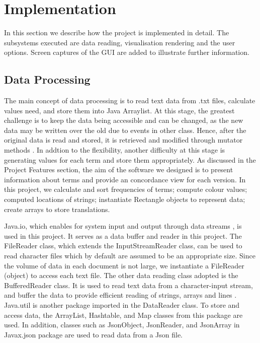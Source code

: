 \clearpage
\section{Implementation}
In this section we describe how the project is implemented in detail. The subsystems executed are data reading, visualisation rendering and the user options. Screen captures of the GUI are added to illustrate further information.

\subsection{Data Processing}

The main concept of data processing is to read text data from .txt files, calculate values need, and store them into Java Arraylist. At this stage, the greatest challenge is to keep the data being accessible and can be changed, as  the new data may be written over the old due to events in other class. Hence, after the original data is read and stored, it is retrieved and modified through  mutator methods \cite{Bob's coding convention}. In addtion to the flexibility, another difficulty at this stage is generating values for each term and store them appropriately. As discussed in the Project Features section, the aim of the software we designed is to present information about terms and provide an concordance view for each version. In this project, we calculate and sort frequencies of terms; compute colour values; computed locations of strings; instantiate Rectangle objects to represent data; create arrays to store translations.

Java.io, which enables for system input and output through data streams \cite{javadoc java.io}, is used in this project. It serves as a data buffer and reader in this project. The FileReader class, which extends the InputStreamReader class, can be used to read character files which by default are assumed to be an appropriate size. Since the volume of data in each document is not large, we instantiate a FileReader (object) to access each text file. The other data reading class adopted is the BufferedReader class. It is used to read text data from a character-input stream, and buffer the data to provide efficient reading of strings, arrays and lines \cite{javadoc7}. Java.util is another package imported in the DataReader class. To store and access data, the ArrayList, Hashtable, and Map classes from this package are used. In addition, classes such as JsonObject, JsonReader, and JsonArray in Javax.json package are used to read data from a Json file.

